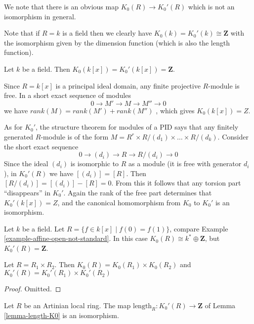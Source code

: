\medskip\noindent
We note that there is an obvious map $K_0(R) \to K_0'(R)$
which is not an isomorphism in general.

\begin{example}
\label{example-K0-field}
Note that if $R = k$ is a field then we clearly have
$K_0(k) = K_0'(k) \cong \mathbf{Z}$ with the isomorphism
given by the dimension function (which is also the length function).
\end{example}

\begin{example}
\label{example-K0-polynomial-ring}
Let $k$ be a field. Then $K_0(k[x]) = K_0'(k[x]) = \mathbf{Z}$.

\medskip\noindent
Since $R=k[x]$ is a principal ideal domain, any finite projective
$R$-module is free. In a short exact sequence of modules
$$
0 \rightarrow M'\rightarrow M\rightarrow M''\rightarrow 0
$$
we have $rank(M)=rank(M')+rank(M'')$ , which gives $K_0(k[x]) = Z$.

\medskip\noindent
As for $K_0'$, the structure theorem for modules of a PID says that
any finitely generated $R$-module is of the form
$M=R^r \times R/(d_1) \times \dots \times R/(d_k)$.
Consider the short exact sequence
$$
0 \rightarrow (d_i) \rightarrow R \rightarrow R/(d_i) \rightarrow 0
$$
Since the ideal $(d_i)$ is isomorphic to $R$ as a module
(it is free with generator $d_i$), in $K_0'(R)$ we have
$[(d_i)]=[R]$.  Then $[R/(d_i)] = [(d_i)]-[R] = 0$.  From this it
follows that any torsion part ``disappears'' in $K_0'$.
Again the rank of the free part determines that $K_0'(k[x]) = Z$,
and the canonical homomorphism from $K_0$ to $K_0'$ is an isomorphism.
\end{example}

\begin{example}
\label{example-K0-node}
Let $k$ be a field. Let $R = \{f \in k[x] \mid f(0) = f(1)\}$,
compare Example \ref{example-affine-open-not-standard}. 
In this case $K_0(R) \cong k^* \oplus \mathbf{Z}$, but
$K_0'(R) = \mathbf{Z}$.
\end{example}

\begin{lemma}
\label{lemma-K0-product}
Let $R = R_1 \times R_2$. Then $K_0(R) = K_0(R_1) \times K_0(R_2)$
and $K_0'(R) = K_0'(R_1) \times K_0'(R_2)$
\end{lemma}

\begin{proof}
Omitted.
\end{proof}

\begin{lemma}
\label{lemma-K0prime-Artinian}
Let $R$ be an Artinian local ring.
The map $\text{length}_R : K_0'(R) \to \mathbf{Z}$
of Lemma \ref{lemma-length-K0} is an isomorphism.
\end{lemma}

